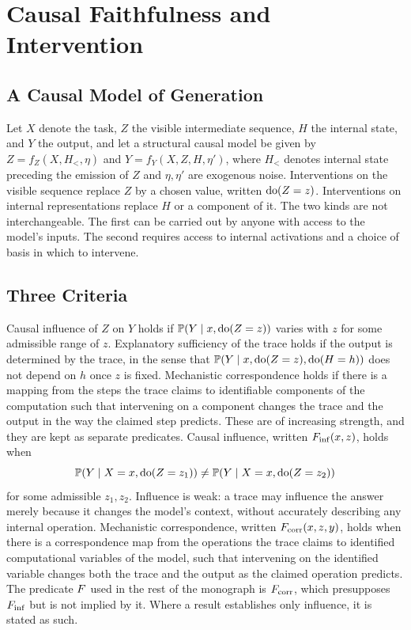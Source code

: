\chapter{Causal Faithfulness and Intervention}
\label{ch:causal}

\section{A Causal Model of Generation}

Let $X$ denote the task, $Z$ the visible intermediate sequence, $H$ the internal state, and $Y$ the output, and let a structural causal model \cite{pearl2009} be given by $Z=f_Z(X,H_{<},\eta)$ and $Y=f_Y(X,Z,H,\eta')$, where $H_<$ denotes internal state preceding the emission of $Z$ and $\eta,\eta'$ are exogenous noise. Interventions on the visible sequence replace $Z$ by a chosen value, written $\operatorname{do}(Z=z)$. Interventions on internal representations replace $H$ or a component of it. The two kinds are not interchangeable. The first can be carried out by anyone with access to the model's inputs. The second requires access to internal activations and a choice of basis in which to intervene.

\section{Three Criteria}

Causal influence of $Z$ on $Y$ holds if $\mathbb{P}(Y\mid x,\operatorname{do}(Z=z))$ varies with $z$ for some admissible range of $z$. Explanatory sufficiency of the trace holds if the output is determined by the trace, in the sense that $\mathbb{P}(Y\mid x,\operatorname{do}(Z=z),\operatorname{do}(H=h))$ does not depend on $h$ once $z$ is fixed. Mechanistic correspondence holds if there is a mapping from the steps the trace claims to identifiable components of the computation such that intervening on a component changes the trace and the output in the way the claimed step predicts. These are of increasing strength, and they are kept as separate predicates. Causal influence, written $F_{\mathrm{inf}}(x,z)$, holds when
\[
\mathbb{P}(Y\mid X=x,\operatorname{do}(Z=z_1))\neq\mathbb{P}(Y\mid X=x,\operatorname{do}(Z=z_2))
\]
for some admissible $z_1,z_2$. Influence is weak: a trace may influence the answer merely because it changes the model's context, without accurately describing any internal operation. Mechanistic correspondence, written $F_{\mathrm{corr}}(x,z,y)$, holds when there is a correspondence map from the operations the trace claims to identified computational variables of the model, such that intervening on the identified variable changes both the trace and the output as the claimed operation predicts. The predicate $F$ used in the rest of the monograph is $F_{\mathrm{corr}}$, which presupposes $F_{\mathrm{inf}}$ but is not implied by it. Where a result establishes only influence, it is stated as such.

